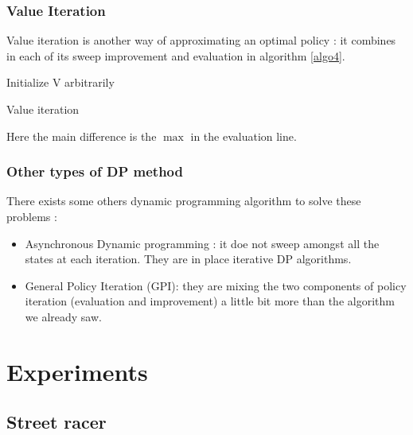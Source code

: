 \documentclass[14pt,a4paper]{article}
\theoremstyle{definition}
\begin{document}
\subsubsection{Value Iteration}
Value iteration is another way of approximating an optimal policy : it combines in each of its sweep improvement and evaluation in algorithm \ref{algo4}.

\begin{algorithm}[H]
    \label{algo4}
    
	    
    Initialize V arbitrarily 
    

    
\caption{Value iteration}
\end{algorithm}


Here the main difference is the $\max$ in the evaluation line.


\subsubsection{Other types of DP method}

There exists some others dynamic programming algorithm to solve these problems : 
\begin{itemize}
\item Asynchronous Dynamic programming : it doe not sweep amongst all the states at each iteration. They are in place iterative DP algorithms.
\item General Policy Iteration (GPI): they are mixing the two components of policy iteration (evaluation and improvement) a little bit more than the algorithm we already saw.
\end{itemize}

\section{Experiments}
\subsection{Street racer}
\end{document}

